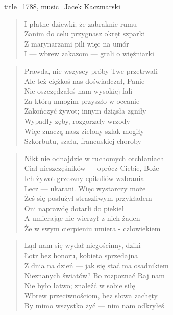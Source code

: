 \begin{song}{title={1788}, music={Jacek Kaczmarski}}
\begin{multicols}{2}
\begin{verse}
        I płatne dziewki; że zabraknie rumu \\
        Zanim do celu przygnasz okręt szparki \\
        Z marynarzami pili więc na umór \\
        I --- wbrew zakazom --- grali o więźniarki
    \end{verse}
    \begin{verse}
        Prawda, nie wszyscy próby Twe przetrwali \\
        Ale też ciężkoś nas doświadczał, Panie \\
        Nie oszczędzałeś nam wysokiej fali \\ 
        Za którą mnogim przyszło w oceanie \\
        Zakończyć żywot; innym dziąsła zgniły \\
        Wypadły zęby, rozgorzały wrzody \\ 
        Więc znaczą nasz zielony szlak mogiły \\
        Szkorbutu, szału, francuskiej choroby
    \end{verse}
    \begin{verse}
        Nikt nie odnajdzie w ruchomych otchłaniach \\
        Ciał nieszczęśników --- oprócz Ciebie, Boże \\
        Ich żywot grzeszny epitafiów wzbrania \\
        Lecz --- ukarani. Więc wystarczy może \\ 
        Żeś się posłużył straszliwym przykładem \\
        Oni naprawdę dotarli do piekieł \\
        A umierając nie wierzył z nich żaden \\
        Że w swym cierpieniu umiera - człowiekiem
    \end{verse}
    \begin{verse}
        Ląd nam się wydał niegościnny, dziki \\
        Łotr bez honoru, kobieta sprzedajna \\
        Z dnia na dzień --- jak się stać ma osadnikiem \\
        Nieznanych światów? Bo rozpoznać Raj nam \\
        Nie było łatwo; znaleźć w sobie siłę \\
        Wbrew przeciwnościom, bez słowa zachęty \\
        By mimo wszystko żyć --- nim nam odkryłeś \\ 

\end{verse}
\end{multicols}
\end{song}
